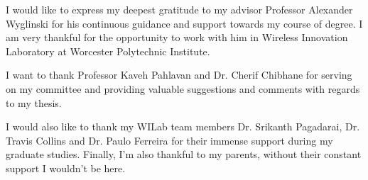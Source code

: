 I would like to express my deepest gratitude to my advisor Professor Alexander Wyglinski for his continuous guidance and support towards my course of degree. I am very thankful for the opportunity to work with him in Wireless Innovation Laboratory at Worcester Polytechnic Institute. 

I want to thank Professor Kaveh Pahlavan and Dr. Cherif Chibhane for serving on my committee and providing valuable suggestions and comments with regards to my thesis. 

I would also like to thank my WILab team members Dr. Srikanth Pagadarai, Dr. Travis Collins and Dr. Paulo Ferreira for their immense support during my graduate studies. Finally, I'm also thankful to my parents, without their constant support I wouldn't be here.
